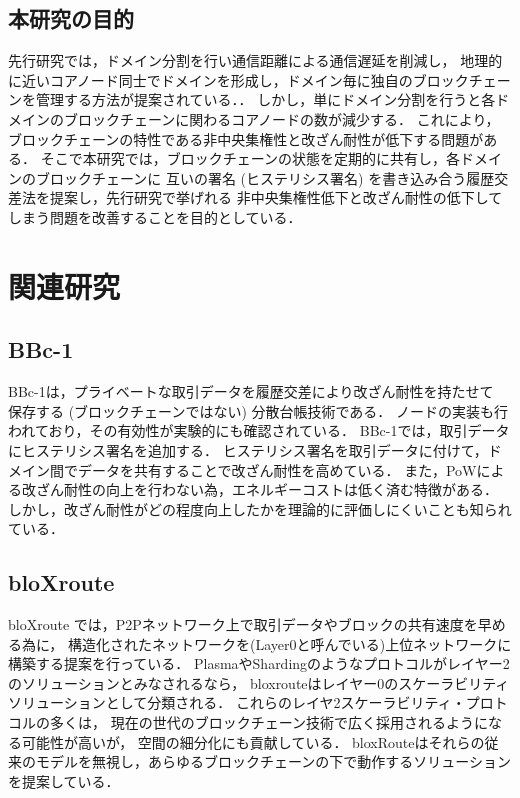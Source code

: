 \documentclass[a4paper,12pt]{jsarticle}
\begin{document}
\subsection{本研究の目的}
先行研究では，ドメイン分割を行い通信距離による通信遅延を削減し，
地理的に近いコアノード同士でドメインを形成し，ドメイン毎に独自のブロックチェーンを管理する方法が提案されている．\cite{fujihara1}\cite{fujihara2}．
しかし，単にドメイン分割を行うと各ドメインのブロックチェーンに関わるコアノードの数が減少する．
これにより，ブロックチェーンの特性である非中央集権性と改ざん耐性が低下する問題がある．
そこで本研究では，ブロックチェーンの状態を定期的に共有し，各ドメインのブロックチェーンに
互いの署名 (ヒステリシス署名) を書き込み合う履歴交差法を提案し，先行研究で挙げれる
非中央集権性低下と改ざん耐性の低下してしまう問題を改善することを目的としている．

\newpage
\section{関連研究}
\subsection{BBc-1}
BBc-1\cite{saito}は，プライベートな取引データを履歴交差により改ざん耐性を持たせて
保存する (ブロックチェーンではない) 分散台帳技術である．
ノードの実装も行われており，その有効性が実験的にも確認されている．
BBc-1では，取引データにヒステリシス署名を追加する．
ヒステリシス署名を取引データに付けて，ドメイン間でデータを共有することで改ざん耐性を高めている．
また，PoWによる改ざん耐性の向上を行わない為，エネルギーコストは低く済む特徴がある．
しかし，改ざん耐性がどの程度向上したかを理論的に評価しにくいことも知られている．

\subsection{bloXroute}
bloXroute \cite{bloX} では，P2Pネットワーク上で取引データやブロックの共有速度を早める為に，
構造化されたネットワークを(Layer0と呼んでいる)上位ネットワークに構築する提案を行っている．
PlasmaやShardingのようなプロトコルがレイヤー2のソリューションとみなされるなら，
bloxrouteはレイヤー0のスケーラビリティソリューションとして分類される．
これらのレイヤ2スケーラビリティ・プロトコルの多くは，
現在の世代のブロックチェーン技術で広く採用されるようになる可能性が高いが，
空間の細分化にも貢献している．
bloxRouteはそれらの従来のモデルを無視し，あらゆるブロックチェーンの下で動作するソリューションを提案している．
\end{document}

